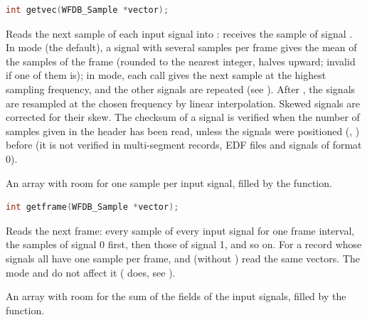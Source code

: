 \begin{lstlisting}[language=C,style=signature]
int getvec(WFDB_Sample *vector);
\end{lstlisting}
Reads the next sample of each input signal into : 
receives the sample of signal . In  mode (the
default), a signal with several samples per frame gives the mean of the
samples of the frame (rounded to the nearest integer, halves upward; invalid
if one of them is); in  mode, each call gives the next
sample at the highest sampling frequency, and the other signals are repeated
(see ). After , the signals are resampled at
the chosen frequency by linear interpolation. Skewed signals are corrected
for their skew. The checksum of a signal is verified when the number of
samples given in the header has been read, unless the signals were
positioned (, ) before (it is not verified
in multi-segment records, EDF files and signals of format 0).
\begin{params}
\item[vector] An array with room for one sample per input signal, filled by
  the function.
\end{params}

\begin{lstlisting}[language=C,style=signature]
int getframe(WFDB_Sample *vector);
\end{lstlisting}
Reads the next frame: every sample of every input signal for one frame
interval, the  samples of signal 0 first, then those of signal 1,
and so on. For a record whose signals all have one sample per frame,
 and  (without ) read the same
vectors. The  mode and  do not affect it
( does, see ).
\begin{params}
\item[vector] An array with room for the sum of the  fields of the
  input signals, filled by the function.
\end{params}

